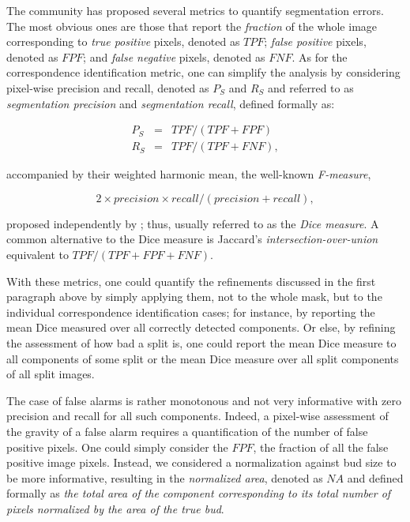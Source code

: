\documentclass[a4paper,authoryear,review]{elsarticle}
\begin{document}
The community has proposed several metrics to quantify segmentation errors. The most obvious ones are those that report the \emph{fraction} of the whole image corresponding to \emph{true positive} pixels, denoted as $TPF$; \emph{false positive} pixels,  denoted as $FPF$;  and \emph{false negative} pixels, denoted as $FNF$. As for the correspondence identification metric, one can simplify the analysis by considering pixel-wise precision and recall, denoted as  $P_S$ and $R_S$ and referred to as \emph{segmentation precision} and \emph{segmentation recall}, defined formally as: 

\begin{eqnarray*} 
    P_S &=& TPF / (TPF + FPF) \\
    R_S &=& TPF / (TPF + FNF),
\end{eqnarray*}

accompanied by their weighted harmonic mean, the well-known \emph{F-measure}, 

\begin{equation} 
   2 \times precision \times recall / (precision + recall),
\end{equation}

proposed independently by \citet{dice1945measures}; thus, usually referred to as the \emph{Dice measure}. A common alternative to the Dice measure is Jaccard’s \emph{intersection-over-union} \citep{jaccard1912distribution} equivalent to $TPF / (TPF+FPF+FNF)$. 

With these metrics, one could quantify the refinements discussed in the first paragraph above by simply applying them, not to the whole mask, but to the individual correspondence identification cases; for instance, by reporting the mean Dice measured over all correctly detected components. Or else, by refining the assessment of how bad a split is, one could report the mean Dice measure to all components of some split or the mean Dice measure over all split components of all split images. 

The case of false alarms is rather monotonous and not very informative with zero precision and recall for all such components. Indeed, a pixel-wise assessment of the gravity of a false alarm requires a quantification of the number of false positive pixels. One could simply consider the $FPF$, the fraction of all the false positive image pixels. Instead, we considered a normalization against bud size to be more informative, resulting in the \emph{normalized area}, denoted as $NA$ and defined formally as \emph{the total area of the component corresponding to its total number of pixels normalized by the area of the true bud}. 
\end{document}
